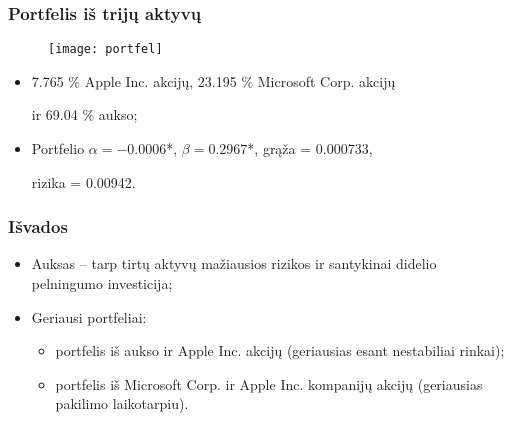 \documentclass[utf8,hyperref={unicode},xcolor=dvipsnames]{beamer}
\theoremstyle{change}\newtheorem{teorema}{Teiginys}
\theoremstyle{change}\newtheorem{salyga}{}
\newcommand{\HH}{\mathrm{H}} %
\newcommand{\Hao}{\HH_{\alpha}^o}
\begin{document}
\begin{frame}
    \frametitle{Portfelis iš trijų aktyvų}
\begin{figure}
\centering
\texttt{[image: portfel]}

\end{figure}

    \begin{itemize}
	\item 7.765 $\%$ Apple Inc. akcijų, 23.195 $\%$ Microsoft Corp. akcijų

 ir 69.04 $\%$ aukso;
	\item Portfelio $\alpha = - 0.0006$*, $\beta= 0.2967$*, grąža = 0.000733, 

rizika = 0.00942.
    \end{itemize}
\end{frame}

\begin{frame}
    \frametitle{Išvados} 

    \begin{itemize}
\item Auksas -- tarp tirtų aktyvų mažiausios rizikos ir santykinai didelio pelningumo investicija;

\item Geriausi portfeliai: 
\begin{itemize}
	\item portfelis iš aukso ir Apple Inc. akcijų (geriausias esant nestabiliai rinkai);
	\item portfelis iš Microsoft Corp. ir Apple Inc. kompanijų akcijų (geriausias pakilimo laikotarpiu).
\end{itemize}
    \end{itemize}

\end{frame}



 
\end{document}
